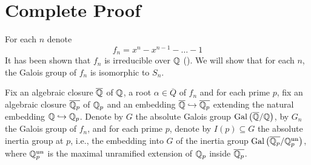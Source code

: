 \documentclass[../main.tex]{subfiles}
\begin{document}
\section{Complete Proof} 

For each $n$ denote 
\[
  f_n = x^{n} - x^{n-1} - \ldots - 1  
\]
It has been shown that $f_n$ is irreducible over $\mathbb{Q}$ ().
We will show that for each $n$, the Galois group of $f_n$ is isomorphic to $S_n$.

Fix an algebraic closure $\overline{\mathbb{Q}}$ of $\mathbb{Q}$, a root $\alpha \in \overline{Q}$ of $f_n$ and for each prime $p$, fix an algebraic closure $\overline{\mathbb{Q}_p}$ of $\mathbb{Q}_p$ and an embedding $\overline{\mathbb{Q}} \hookrightarrow \overline{\mathbb{Q}_p}$ extending the natural embedding $\mathbb{Q} \hookrightarrow \mathbb{Q}_p$.
Denote by $G$ the absolute Galois group $\operatorname{Gal}\left( \overline{\mathbb{Q}}/\mathbb{Q} \right)$, by $G_n$ the Galois group of $f_n$, and for each prime $p$, denote by $I\left( p \right) \subseteq G$ the absolute inertia group at $p$, i.e., the embedding into $G$ of the inertia group $\operatorname{Gal}\left( \overline{\mathbb{Q}_p}/\mathbb{Q}_p^{\operatorname{un}} \right)$, where $\mathbb{Q}_p^{\operatorname{un}}$ is the maximal unramified extension of $\mathbb{Q}_p$ inside $\overline{\mathbb{Q}_p}$.
\end{document}
